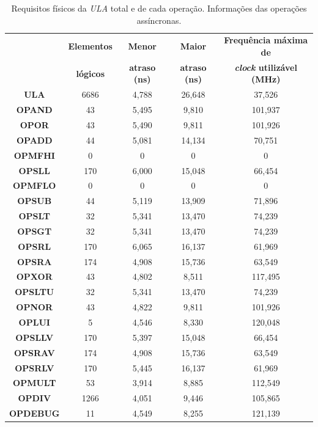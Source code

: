 \documentclass[12pt]{article}
\begin{document}
\begin{table}[H]
	\centering
	\begin{tabular}{|c|c|c|c|c|}
		\hline
		& \textbf{Elementos} & \textbf{Menor} & \textbf{Maior} & \textbf{Frequência máxima de} \\
		& \textbf{lógicos} & \textbf{atraso (ns)} &  \textbf{atraso (ns)} & \textbf{\textit{clock} utilizável (MHz)} \\
		\hline
		\textbf{ULA} & 6686 & 4,788 & 26,648 & 37,526 \\\hline
		\textbf{OPAND} & 43 & 5,495 & 9,810 & 101,937 \\\hline
		\textbf{OPOR} & 43 & 5,490 & 9,811 & 101,926 \\\hline
		\textbf{OPADD} & 44 & 5,081 & 14,134 & 70,751 \\\hline
		\textbf{OPMFHI} & 0 & 0 & 0 & 0 \\\hline
		\textbf{OPSLL} & 170 & 6,000 & 15,048 & 66,454 \\\hline
		\textbf{OPMFLO} & 0 & 0 & 0 & 0 \\\hline
		\textbf{OPSUB} & 44 & 5,119 & 13,909 & 71,896 \\\hline
		\textbf{OPSLT} & 32 & 5,341 & 13,470 & 74,239 \\\hline
		\textbf{OPSGT} & 32 & 5,341 & 13,470 & 74,239 \\\hline
		\textbf{OPSRL} & 170 & 6,065 & 16,137 & 61,969 \\\hline
		\textbf{OPSRA} & 174 & 4,908 & 15,736 & 63,549 \\\hline
		\textbf{OPXOR} & 43 & 4,802 & 8,511 & 117,495 \\\hline
		\textbf{OPSLTU} & 32 & 5,341 & 13,470 & 74,239 \\\hline
		\textbf{OPNOR} & 43 & 4,822 & 9,811 & 101,926 \\\hline
		\textbf{OPLUI} & 5 & 4,546 & 8,330 & 120,048 \\\hline
		\textbf{OPSLLV} & 170 & 5,397 & 15,048 & 66,454 \\\hline
		\textbf{OPSRAV} & 174 & 4,908 & 15,736 & 63,549 \\\hline
		\textbf{OPSRLV} & 170 & 5,445 & 16,137 & 61,969 \\\hline
		\textbf{OPMULT} & 53 & 3,914 & 8,885 & 112,549 \\\hline
		\textbf{OPDIV} & 1266 & 4,051 & 9,446 & 105,865 \\\hline
		\textbf{OPDEBUG} & 11 & 4,549 & 8,255 & 121,139 \\\hline
	\end{tabular}
	\caption{Requisitos físicos da \textit{ULA} total e de cada operação. Informações das operações assíncronas.}
	\label{tab:req21}
\end{table}
\end{document}
